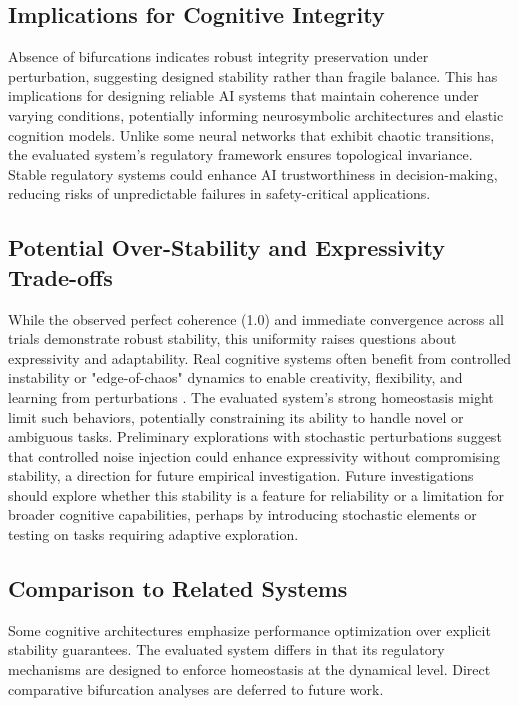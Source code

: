 \documentclass[11pt,a4paper]{article}
\begin{document}
\subsection{Implications for Cognitive Integrity}

Absence of bifurcations indicates robust integrity preservation under perturbation, suggesting designed stability rather than fragile balance. This has implications for designing reliable AI systems that maintain coherence under varying conditions, potentially informing neurosymbolic architectures and elastic cognition models. Unlike some neural networks that exhibit chaotic transitions, the evaluated system's regulatory framework ensures topological invariance. Stable regulatory systems could enhance AI trustworthiness in decision-making, reducing risks of unpredictable failures in safety-critical applications.

\subsection{Potential Over-Stability and Expressivity Trade-offs}

While the observed perfect coherence (1.0) and immediate convergence across all trials demonstrate robust stability, this uniformity raises questions about expressivity and adaptability. Real cognitive systems often benefit from controlled instability or "edge-of-chaos" dynamics to enable creativity, flexibility, and learning from perturbations \cite{Strogatz2018}. The evaluated system's strong homeostasis might limit such behaviors, potentially constraining its ability to handle novel or ambiguous tasks. Preliminary explorations with stochastic perturbations suggest that controlled noise injection could enhance expressivity without compromising stability, a direction for future empirical investigation. Future investigations should explore whether this stability is a feature for reliability or a limitation for broader cognitive capabilities, perhaps by introducing stochastic elements or testing on tasks requiring adaptive exploration.

\subsection{Comparison to Related Systems}

Some cognitive architectures emphasize performance optimization over explicit stability guarantees. The evaluated system differs in that its regulatory mechanisms are designed to enforce homeostasis at the dynamical level. Direct comparative bifurcation analyses are deferred to future work.
\end{document}
